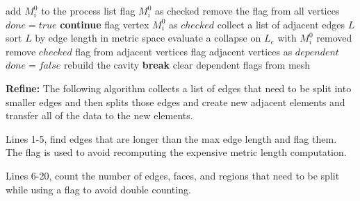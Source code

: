 \documentclass{article}
\begin{document}
\begin{algorithm}[H]
\caption{Coarsen}
\begin{algorithmic}[1]
             
                 
                    \State add $M^0_i$ to the process list
                \EndIf
                \State flag $M^0_i$ as checked 
            \EndFor
        \EndIf
    \EndFor
    \State remove the flag from all vertices
     
        \State $done = true$
             
                \State \textbf{continue}
            \EndIf
            \State flag vertex $M^0_i$ as $checked$ 
            \State collect a list of adjacent edges $L$
            \State sort $L$ by edge length in metric space
                \State evaluate a collapse on $L_e$ with $M^0_i$ removed
                    \State remove $checked$ flag from adjacent vertices 
                    \State flag adjacent vertices as $dependent$
                    \State $done = false$
                    \State rebuild the cavity
                    \State \textbf{break} 
                \EndIf
            \EndFor
        \EndWhile
        \State clear dependent flags from mesh
    \EndWhile
\end{algorithmic}
\end{algorithm}

\textbf{Refine:} The following algorithm collects a list of edges that need to be split into smaller edges and then splits those edges and create new adjacent elements and transfer all of the data to the new elements. 

Lines 1-5, find edges that are longer than the max edge length and flag them. The flag is used to avoid recomputing the expensive metric length computation.

Lines 6-20, count the number of edges, faces, and regions that need to be split while using a flag to avoid double counting.
\end{document}
